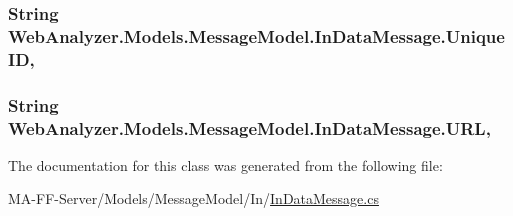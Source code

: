 \subsubsection[{Unique\+I\+D}]{\setlength{\rightskip}{0pt plus 5cm}String Web\+Analyzer.\+Models.\+Message\+Model.\+In\+Data\+Message.\+Unique\+I\+D\hspace{0.3cm}{\ttfamily [get]}, {\ttfamily [set]}}\label{class_web_analyzer_1_1_models_1_1_message_model_1_1_in_data_message_ad46f5d3693e3dc7de2a1a94def3f6259}
\hypertarget{class_web_analyzer_1_1_models_1_1_message_model_1_1_in_data_message_a16e5e70d5df3ff7cf9c32793809c9beb}{}
\subsubsection[{U\+R\+L}]{\setlength{\rightskip}{0pt plus 5cm}String Web\+Analyzer.\+Models.\+Message\+Model.\+In\+Data\+Message.\+U\+R\+L\hspace{0.3cm}{\ttfamily [get]}, {\ttfamily [set]}}\label{class_web_analyzer_1_1_models_1_1_message_model_1_1_in_data_message_a16e5e70d5df3ff7cf9c32793809c9beb}


The documentation for this class was generated from the following file\+:\begin{DoxyCompactItemize}
\item 
M\+A-\/\+F\+F-\/\+Server/\+Models/\+Message\+Model/\+In/\hyperlink{_in_data_message_8cs}{In\+Data\+Message.\+cs}\end{DoxyCompactItemize}
